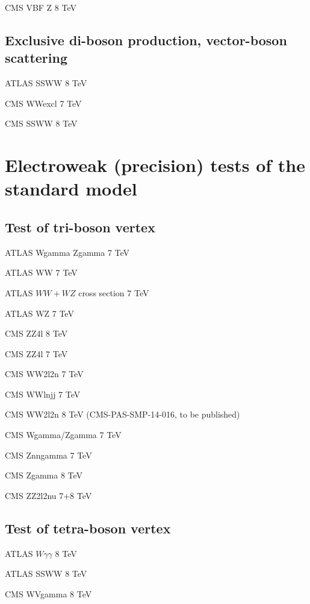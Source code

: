 \documentclass[12pt]{iopart}
\begin{document}
CMS VBF Z 8 TeV~\cite{Khachatryan:2014dea}

\subsection{Exclusive di-boson production, vector-boson scattering}

ATLAS SSWW 8 TeV~\cite{Aad:2014zda}

CMS WWexcl 7 TeV~\cite{Chatrchyan:2013foa}

CMS SSWW 8 TeV~\cite{Khachatryan:2014sta}

\section{Electroweak (precision) tests of the standard model}
\subsection{Test of tri-boson vertex}

ATLAS Wgamma Zgamma 7 TeV~\cite{Aad:2013izg}

ATLAS WW 7 TeV~\cite{ATLAS:2012mec}

ATLAS $WW+WZ$ cross section 7 TeV~\cite{Aad:2014mda}

ATLAS WZ 7 TeV~\cite{Aad:2012twa}

CMS ZZ4l 8 TeV~\cite{Khachatryan:2014dia}

CMS ZZ4l 7 TeV~\cite{Chatrchyan:2012sga}

CMS WW2l2n 7 TeV~\cite{Chatrchyan:2013yaa}

CMS WWlnjj 7 TeV~\cite{Chatrchyan:2012bd}

CMS WW2l2n 8 TeV (CMS-PAS-SMP-14-016, to be published)

CMS Wgamma/Zgamma 7 TeV~\cite{Chatrchyan:2013fya}

CMS Znngamma 7 TeV~\cite{Chatrchyan:2013nda}

CMS Zgamma 8 TeV~\cite{Khachatryan:2015kea}

CMS ZZ2l2nu 7+8 TeV~\cite{Khachatryan:2015pba}

\subsection{Test of tetra-boson vertex}

ATLAS $W\gamma\gamma$ 8 TeV~\cite{Aad:2015uqa}

ATLAS SSWW 8 TeV~\cite{Aad:2014zda}

CMS WVgamma 8 TeV~\cite{Chatrchyan:2014bza}
\end{document}
